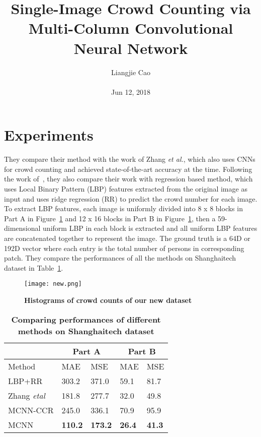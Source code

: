 \documentclass[10pt,twocolumn,letterpaper]{article}
\begin{document}
\title{Single-Image Crowd Counting via Multi-Column Convolutional Neural Network}
\author{Liangjie Cao
\\\\Jun 12, 2018}
\maketitle
\section{Experiments}
 They compare their method with the work of Zhang \emph{et al.}, which also uses CNNs for crowd counting and achieved state-of-the-art accuracy at the time. Following the work of~\cite{name33}, they also compare their work with regression based method, which uses Local Binary Pattern (LBP) features extracted from the original image as input and uses ridge regression (RR) to predict the crowd number for each image. To extract LBP features, each image is uniformly divided into 8 x 8 blocks in Part A in Figure~\ref{Figure2} and 12 x 16 blocks in Part B in Figure~\ref{Figure2}, then a 59-dimensional uniform LBP in each block is extracted and all uniform LBP features are concatenated together to represent the image. The ground truth is a 64D or 192D vector where each entry is the total number of persons in corresponding patch. They compare the performances of all the methods on Shanghaitech dataset in Table~\ref{Table1}.
 \begin{figure}[!htb]
 \centering
 \texttt{[image: new.png]}\\
 \caption{\textbf{Histograms of crowd counts of our new dataset}}\label{Figure2}
 \end{figure}
  \begin{table}[!ht]
  \centering
 \begin{tabular}{|p{2cm}|p{1cm}|p{1cm}|p{1cm}|p{1cm}|}
    \hline
        & \multicolumn{2}{c|}{Part A} & \multicolumn{2}{c|}{Part B}  \\
    \hline
    Method & MAE & MSE & MAE & MSE \\
    \hline
    LBP+RR & 303.2 & 371.0 & 59.1 & 81.7 \\
    \hline
    Zhang \emph{etal}~\cite{name33} & 181.8 & 277.7 & 32.0 & 49.8  \\
    \hline
    MCNN-CCR & 245.0 & 336.1 & 70.9 & 95.9\\
    \hline
     MCNN & \textbf{110.2} & \textbf{173.2} & \textbf{26.4} & \textbf{41.3}  \\
     \hline
  \end{tabular}
  \caption{\textbf{Comparing performances of different methods on Shanghaitech dataset}} \label{Table1}
  \end{table}
\end{document}
